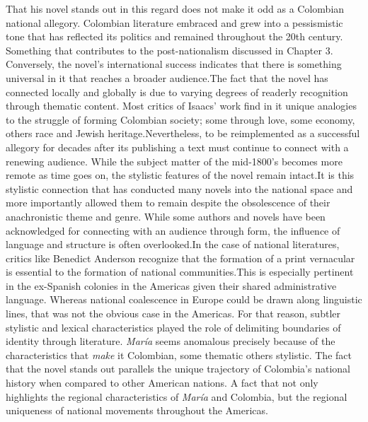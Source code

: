 \documentclass[12pt]{report}
\begin{document}
That his novel stands out in this regard does not make it odd as a Colombian national allegory. 
Colombian literature embraced and grew into a pessismistic tone that has reflected its politics and remained throughout the 20th century.
Something that contributes to the post-nationalism discussed in Chapter 3.
Conversely, the novel's international success indicates that there is something universal in it that reaches a broader audience.The fact that the novel has connected locally and globally is due to varying degrees of readerly recognition through thematic content.
Most critics of Isaacs' work find in it unique analogies to the struggle of forming Colombian society; some through love, some economy, others race and Jewish heritage.Nevertheless, to be reimplemented as a successful allegory for decades after its publishing a text must continue to connect with a renewing audience.
While the subject matter of the mid-1800's becomes more remote as time goes on, the stylistic features of the novel remain intact.It is this stylistic connection that has conducted many novels into the national space and more importantly allowed them to remain despite the obsolescence of their anachronistic theme and genre.
While some authors and novels have been acknowledged for connecting with an audience through form, the influence of language and structure is often overlooked.In the case of national literatures, critics like Benedict Anderson recognize that the formation of a print vernacular is essential to the formation of national communities.This is especially pertinent in the ex-Spanish colonies in the Americas given their shared administrative language. 
Whereas national coalescence in Europe could be drawn along linguistic lines, that was not the obvious case in the Americas. For that reason, subtler stylistic and lexical characteristics played the role of delimiting boundaries of identity through literature. 
\textit{María} seems anomalous precisely because of the characteristics that \textit{make} it Colombian, some thematic others stylistic.
The fact that the novel stands out parallels the unique trajectory of Colombia's national history when compared to other American nations. 
A fact that not only highlights the regional characteristics of \textit{María} and Colombia, but the regional uniqueness of national movements throughout the Americas.
\end{document}
